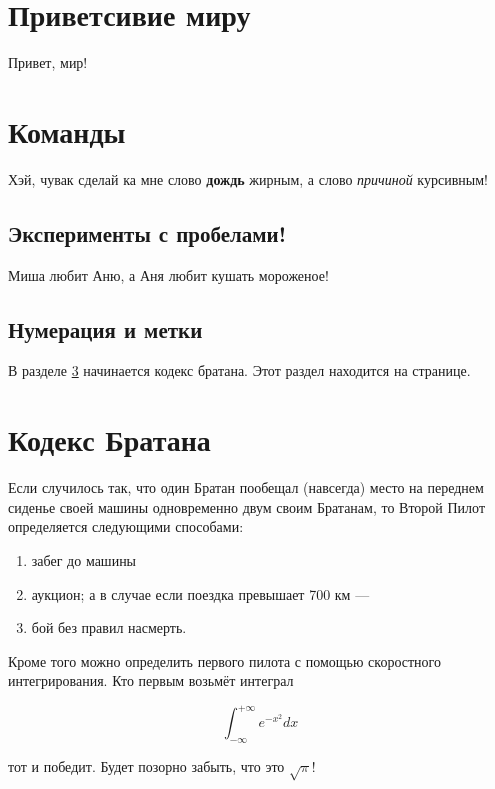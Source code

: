 \documentclass[12pt, a4paper]{article}  %
\begin{document}



\section{Приветсивие миру}
Привет, мир! 

\section{Команды}

Хэй, чувак сделай ка мне слово \textbf{дождь} жирным, а слово \textit{причиной} курсивным!

\subsection{Эксперименты с пробелами!}

Миша любит          Аню, а Аня любит      кушать мороженое! 

\subsection{Нумерация и метки}

В разделе \ref{bratan_page} начинается кодекс братана.  Этот раздел находится на \pageref{bratan_page} странице. 


\section{Кодекс Братана}  \label{bratan_page} 

Если случилось так, что один Братан пообещал (навсегда) место на переднем сиденье своей машины одновременно двум своим Братанам, то Второй Пилот определяется следующими способами:


\begin{enumerate}
\item забег до машины
\item аукцион; а в случае если поездка превышает 700 км ---
\item бой без правил насмерть.  %
\end{enumerate}






Кроме того можно определить первого пилота с помощью скоростного интегрирования. Кто первым возьмёт интеграл 

\[ \int_{-\infty}^{+\infty} e^{-x^2} dx \] 

тот и победит. Будет позорно забыть, что это $\sqrt{\pi}$!
\end{document}
